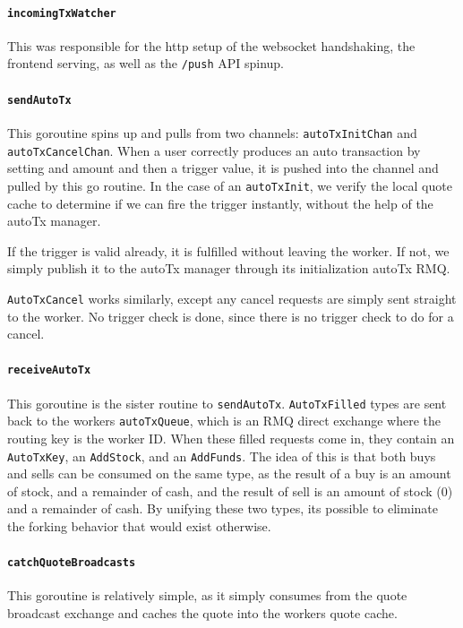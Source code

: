\paragraph{\texttt{incomingTxWatcher}}
This was responsible for the http setup of the websocket handshaking, the frontend serving, as well as the \texttt{/push} API spinup.

\paragraph{\texttt{sendAutoTx}}
This goroutine spins up and pulls from two channels: \texttt{autoTxInitChan} and \texttt{autoTxCancelChan}.
When a user correctly produces an auto transaction by setting and amount and then a trigger value, it is pushed into the channel and pulled by this go routine.
In the case of an \texttt{autoTxInit}, we verify the local quote cache to determine if we can fire the trigger instantly, without the help of the autoTx manager.

If the trigger is valid already, it is fulfilled without leaving the worker.
If not, we simply publish it to the autoTx manager through its initialization autoTx RMQ.

\texttt{AutoTxCancel} works similarly, except any cancel requests are simply sent straight to the worker.
No trigger check is done, since there is no trigger check to do for a cancel.

\paragraph{\texttt{receiveAutoTx}}
This goroutine is the sister routine to \texttt{sendAutoTx}. \texttt{AutoTxFilled} types are sent back to the workers \texttt{autoTxQueue}, which is an RMQ direct exchange where the routing key is the worker ID.
When these filled requests come in, they contain an \texttt{AutoTxKey}, an \texttt{AddStock}, and an \texttt{AddFunds}.
The idea of this is that both buys and sells can be consumed on the same type, as the result of a buy is an amount of stock, and a remainder of cash, and the result of sell is an amount of stock (0) and a remainder of cash.
By unifying these two types, its possible to eliminate the forking behavior that would exist otherwise.

\paragraph{\texttt{catchQuoteBroadcasts}}
This goroutine is relatively simple, as it simply consumes from the quote broadcast exchange and caches the quote into the workers quote cache.

